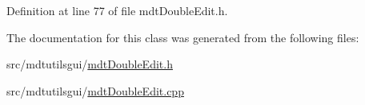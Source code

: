Definition at line 77 of file mdt\-Double\-Edit.\-h.



The documentation for this class was generated from the following files\-:\begin{DoxyCompactItemize}
\item 
src/mdtutilsgui/\hyperlink{mdt_double_edit_8h}{mdt\-Double\-Edit.\-h}\item 
src/mdtutilsgui/\hyperlink{mdt_double_edit_8cpp}{mdt\-Double\-Edit.\-cpp}\end{DoxyCompactItemize}
